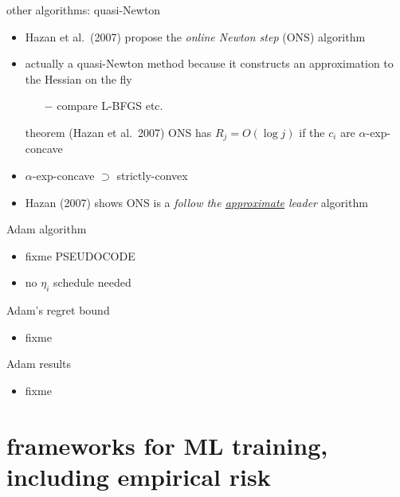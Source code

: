 \documentclass[xcolor={svgnames},
               hyperref={colorlinks,citecolor=DeepPink4,linkcolor=FireBrick,urlcolor=Maroon}]
               {beamer}
\begin{document}
\begin{frame}{other algorithms: quasi-Newton}

\begin{itemize}
\item Hazan et al.~(2007) propose the \emph{online Newton step} (ONS) algorithm
\item actually a quasi-Newton method because it constructs an approximation to the Hessian on the fly
    \begin{itemize}
    \item[$-$] compare L-BFGS etc.
    \end{itemize}

\begin{block}{theorem (Hazan et al.~2007)}
ONS has $R_j = O(\log j)$ if the $c_i$ are $\alpha$-exp-concave
\end{block}

\item $\alpha$-exp-concave $\supset$ strictly-convex
\item Hazan (2007) shows ONS is a \emph{follow the \underline{approximate} leader} algorithm
\end{itemize}
\end{frame}


\begin{frame}{Adam algorithm}

\begin{itemize}
\item fixme PSEUDOCODE
\item no $\eta_i$ schedule needed
\end{itemize}
\end{frame}


\begin{frame}{Adam's regret bound}

\begin{itemize}
\item fixme
\end{itemize}
\end{frame}


\begin{frame}{Adam results}

\begin{itemize}
\item fixme
\end{itemize}
\end{frame}


\section{frameworks for ML training, including empirical risk}
\end{document}
